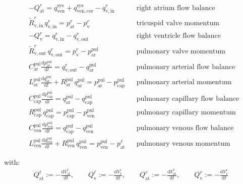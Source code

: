 \documentclass[a4paper,12pt]{report}
\begin{document}
\begin{align}
&-Q_{\mathrm{at}}^{r} = q_{\mathrm{ven}}^{\mathrm{sys}} + q_{\mathrm{ven,cor}}^{\mathrm{sys}} - q_{\mathrm{v,in}}^{r} && \text{right atrium flow balance}\nonumber\\
&\tilde{R}_{\mathrm{v,in}}^{r}\,q_{\mathrm{v,in}}^{r} = p_{\mathrm{at}}^{r}-p_{\mathrm{v}}^{r} && \text{tricuspid valve momentum}\nonumber\\
&-Q_{\mathrm{v}}^{r} = q_{\mathrm{v,in}}^{r} - q_{\mathrm{v,out}}^{r} && \text{right ventricle flow balance}\nonumber\\
&\tilde{R}_{\mathrm{v,out}}^{r}\,q_{\mathrm{v,out}}^{r} = p_{\mathrm{v}}^{r}-p_{\mathrm{ar}}^{\mathrm{pul}} && \text{pulmonary valve momentum}\nonumber\\
&C_{\mathrm{ar}}^{\mathrm{pul}} \frac{\mathrm{d}p_{\mathrm{ar}}^{\mathrm{pul}}}{\mathrm{d}t} = q_{\mathrm{v,out}}^{r} - q_{\mathrm{ar}}^{\mathrm{pul}} && \text{pulmonary arterial flow balance}\nonumber\\
&L_{\mathrm{ar}}^{\mathrm{pul}}\frac{\mathrm{d}q_{\mathrm{ar}}^{\mathrm{pul}}}{\mathrm{d}t} + R_{\mathrm{ar}}^{\mathrm{pul}}\,q_{\mathrm{ar}}^{\mathrm{pul}}=p_{\mathrm{ar}}^{\mathrm{pul}} -p_{\mathrm{cap}}^{\mathrm{pul}} && \text{pulmonary arterial momentum}\nonumber\\
&C_{\mathrm{cap}}^{\mathrm{pul}} \frac{\mathrm{d}p_{\mathrm{cap}}^{\mathrm{pul}}}{\mathrm{d}t} = q_{\mathrm{ar}}^{\mathrm{pul}} - q_{\mathrm{cap}}^{\mathrm{pul}} && \text{pulmonary capillary flow balance}\nonumber\\
&R_{\mathrm{cap}}^{\mathrm{pul}}\,q_{\mathrm{cap}}^{\mathrm{pul}}=p_{\mathrm{cap}}^{\mathrm{pul}}-p_{\mathrm{ven}}^{\mathrm{pul}} && \text{pulmonary capillary momentum}\nonumber\\
&C_{\mathrm{ven}}^{\mathrm{pul}} \frac{\mathrm{d}p_{\mathrm{ven}}^{\mathrm{pul}}}{\mathrm{d}t} = q_{\mathrm{cap}}^{\mathrm{pul}} - q_{\mathrm{ven}}^{\mathrm{pul}} && \text{pulmonary venous flow balance}\nonumber\\
&L_{\mathrm{ven}}^{\mathrm{pul}}\frac{\mathrm{d}q_{\mathrm{ven}}^{\mathrm{pul}}}{\mathrm{d}t} + R_{\mathrm{ven}}^{\mathrm{pul}}\, q_{\mathrm{ven}}^{\mathrm{pul}}=p_{\mathrm{ven}}^{\mathrm{pul}}-p_{\mathrm{at}}^{\ell} && \text{pulmonary venous momentum}\nonumber
\end{align}

with:
\begin{align}
Q_{\mathrm{at}}^{\ell} := -\frac{\mathrm{d}V_{\mathrm{at}}^{\ell}}{\mathrm{d}t}, \qquad
Q_{\mathrm{v}}^{\ell} := -\frac{\mathrm{d}V_{\mathrm{v}}^{\ell}}{\mathrm{d}t}, \qquad
Q_{\mathrm{at}}^{r} := -\frac{\mathrm{d}V_{\mathrm{at}}^{r}}{\mathrm{d}t}, \qquad
Q_{\mathrm{v}}^{r} := -\frac{\mathrm{d}V_{\mathrm{v}}^{r}}{\mathrm{d}t} \nonumber
\end{align}
\end{document}
